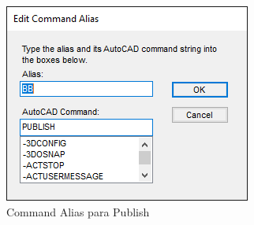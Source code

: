\documentclass[12pt,letterpaper,final]{report}
\begin{document}
\begin{figure}[H]
	\centering
	\includegraphics[width=0.75\linewidth, height=0.5\textheight,keepaspectratio]{Imagenes/autocad_alias_publish_01}
	\caption{Command Alias para Publish}
	\label{fig:autocadaliaspublish01}
\end{figure}
\end{document}
